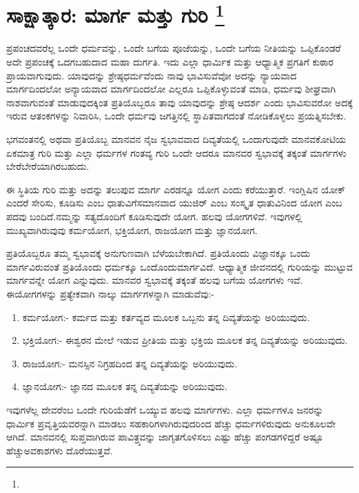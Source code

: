 
\vspace{-0.6cm}

\chapter[ಸಾಕ್ಷಾತ್ಕಾರ: ಮಾರ್ಗ ಮತ್ತು ಗುರಿ ]{ಸಾಕ್ಷಾತ್ಕಾರ: ಮಾರ್ಗ ಮತ್ತು ಗುರಿ \protect\footnote{}}

ಪ್ರಪಂಚದವರೆಲ್ಲ ಒಂದೇ ಧರ್ಮವನ್ನು, ಒಂದೇ ಬಗೆಯ ಪೂಜೆಯನ್ನು, ಒಂದೇ ಬಗೆಯ ನೀತಿಯನ್ನು ಒಪ್ಪಿಕೊಂಡರೆ ಅದೇ ಪ್ರಪಂಚಕ್ಕೆ ಒದಗಬಹುದಾದ ಮಹಾ ದುರ್ಗತಿ. ಇದು ಎಲ್ಲಾ ಧಾರ್ಮಿಕ ಮತ್ತು ಆಧ್ಯಾತ್ಮಿಕ ಪ್ರಗತಿಗೆ ಕುಠಾರ ಪ್ರಾಯವಾಗುವುದು. ಯಾವುದನ್ನು ಶ್ರೇಷ್ಠಧರ್ಮವೆಂದು ನಾವು ಭಾವಿಸುವೆವೋ ಅದನ್ನು ನ್ಯಾಯವಾದ ಮಾರ್ಗದಿಂದಲೋ ಅನ್ಯಾಯವಾದ ಮಾರ್ಗದಿಂದಲೋ ಎಲ್ಲರೂ ಒಪ್ಪಿಕೊಳ್ಳುವಂತೆ ಮಾಡಿ, ಧರ್ಮವು ಶೀಘ್ರವಾಗಿ ನಾಶವಾಗುವಂತೆ ಮಾಡುವುದಕ್ಕಿಂತ ಪ್ರತಿಯೊಬ್ಬರೂ ತಾವು ಯಾವುದನ್ನು ಶ್ರೇಷ್ಠ ಆದರ್ಶ ಎಂದು ಭಾವಿಸುವರೋ ಅದಕ್ಕೆ ಇರುವ ಆತಂಕಗಳನ್ನು ನಿವಾರಿಸಿ, ಒಂದೇ ಧರ್ಮವು ಜಗತ್ತಿನಲ್ಲಿ ಸ್ಥಾಪಿತವಾಗದಂತೆ ನೋಡಿಕೊಳ್ಳಲು ಪ್ರಯತ್ನಿಸಬೇಕು.

ಭಗವಂತನಲ್ಲಿ ಅಥವಾ ಪ್ರತಿಯೊಬ್ಬ ಮಾನವನ ನೈಜ ಸ್ವಭಾವವಾದ ದಿವ್ಯತೆಯಲ್ಲಿ ಒಂದಾಗುವುದೇ ಮಾನವಕೋಟಿಯ ಏಕಮಾತ್ರ ಗುರಿ ಮತ್ತು ಎಲ್ಲಾ ಧರ್ಮಗಳ ಗಂತವ್ಯ ಗುರಿ ಒಂದೇ ಆದರೂ ಮಾನವರ ಸ್ವಭಾವಕ್ಕೆ ತಕ್ಕಂತೆ ಮಾರ್ಗಗಳು ಬೇರೆಬೇರೆಯಾಗಿರ\-ಬಹುದು.

ಈ ಸ್ಥಿತಿಯ ಗುರಿ ಮತ್ತು ಅದನ್ನು ತಲುಪುವ ಮಾರ್ಗ ಎರಡನ್ನೂ ಯೋಗ ಎಂದು ಕರೆಯುತ್ತಾರೆ. ಇಂಗ್ಲಿಷಿನ ಯೋಕ್​ ಎಂದರೆ ಸೇರಿಸು, ಕೂಡಿಸು ಎಂಬ ಧಾತುವಿಗೆ\break ಸಮಾನವಾದ ಯುಜಿರ್​ ಎಂಬ ಸಂಸ್ಕೃತ ಧಾತುವಿನಿಂದ ಯೋಗ ಎಂಬ ಪದವು ಬಂದಿದೆ.\break ನಮ್ಮನ್ನು ಸತ್ಯದೊಂದಿಗೆ ಕೂಡಿಸುವುದೇ ಯೋಗ. ಹಲವು ಯೋಗಗಳಿವೆ. ಇವುಗಳಲ್ಲಿ ಮುಖ್ಯವಾಗಿರುವುವು ಕರ್ಮಯೋಗ, ಭಕ್ತಿಯೋಗ, ರಾಜಯೋಗ ಮತ್ತು ಜ್ಞಾನಯೋಗ.

ಪ್ರತಿಯೊಬ್ಬರೂ ತಮ್ಮ ಸ್ವಭಾವಕ್ಕೆ ಅನುಗುಣವಾಗಿ ಬೆಳೆಯಬೇಕಾಗಿದೆ. ಪ್ರತಿಯೊಂದು ವಿಜ್ಞಾನಕ್ಕೂ ಒಂದು ಮಾರ್ಗವಿರುವಂತೆ ಪ್ರತಿಯೊಂದು ಧರ್ಮಕ್ಕೂ ಒಂದೊಂದು\break ಮಾರ್ಗವಿದೆ. ಆಧ್ಯಾತ್ಮಿಕ ಜೀವನದಲ್ಲಿ ಗುರಿಯನ್ನು ಮುಟ್ಟುವ ಮಾರ್ಗವನ್ನೇ ಯೋಗ ಎನ್ನುವುದು. ಮಾನವರ ಸ್ವಭಾವಕ್ಕೆ ತಕ್ಕಂತೆ ಹಲವು ಬಗೆಯ ಯೋಗಗಳು ಇವೆ. ಈ\break ಯೋಗಗಳನ್ನು ಪ್ರತ್ಯೇಕವಾಗಿ ನಾಲ್ಕು ಮಾರ್ಗಗಳನ್ನಾಗಿ ಮಾಡುವೆವು:-

\begin{enumerate}
\item ಕರ್ಮಯೋಗ:- ಕರ್ಮದ ಮತ್ತು ಕರ್ತವ್ಯದ ಮೂಲಕ ಒಬ್ಬನು ತನ್ನ ದಿವ್ಯತೆಯನ್ನು ಅರಿಯುವುದು.

 \item ಭಕ್ತಿಯೋಗ:- ಈಶ್ವರನ ಮೇಲೆ ಇಡುವ ಪ್ರೀತಿಯ ಮತ್ತು ಭಕ್ತಿಯ ಮೂಲಕ ತನ್ನ ದಿವ್ಯತೆಯನ್ನು ಅರಿಯುವುದು.

 \item ರಾಜಯೋಗ:- ಮನಸ್ಸಿನ ನಿಗ್ರಹದಿಂದ ತನ್ನ ದಿವ್ಯತೆಯನ್ನು ಅರಿಯುವುದು.

 \item ಜ್ಞಾನಯೋಗ:- ಜ್ಞಾನದ ಮೂಲಕ ತನ್ನ ದಿವ್ಯತೆಯನ್ನು ಅರಿಯುವುದು.

\end{enumerate}

ಇವುಗಳೆಲ್ಲ ದೇವರೆಂಬ ಒಂದೇ ಗುರಿಯೆಡೆಗೆ ಒಯ್ಯುವ ಹಲವು ಮಾರ್ಗಗಳು. ಎಲ್ಲಾ ಧರ್ಮಗಳೂ ಜನರನ್ನು ಧಾರ್ಮಿಕ ಪ್ರವೃತ್ತಿಯವರನ್ನಾಗಿ ಮಾಡಲು ಸಹಕಾರಿಗಳಾಗಿರುವುದರಿಂದ ಹೆಚ್ಚು ಧರ್ಮಗಳಿರುವುದು ಅನುಕೂಲವೇ ಆಗಿದೆ. ಮಾನವನಲ್ಲಿ ಸುಪ್ತವಾಗಿರುವ ಪಾವಿತ್ರ್ಯವನ್ನು ಜಾಗೃತಗೊಳಿಸಲು ಎಷ್ಟು ಹೆಚ್ಚು ಪಂಗಡಗಳಿದ್ದರೆ ಅಷ್ಟೂ ಹೆಚ್ಚು\break ಅವಕಾಶಗಳು ದೊರೆಯುತ್ತವೆ.

